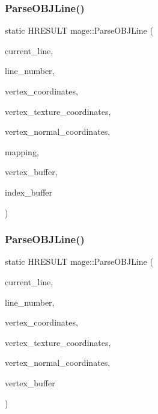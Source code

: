 \subsubsection{\texorpdfstring{Parse\+O\+B\+J\+Line()}{ParseOBJLine()}\hspace{0.1cm}{\footnotesize\ttfamily [1/2]}}
{\footnotesize\ttfamily static H\+R\+E\+S\+U\+LT mage\+::\+Parse\+O\+B\+J\+Line (\begin{DoxyParamCaption}\item[{char $\ast$}]{current\+\_\+line,  }\item[{uint32\+\_\+t}]{line\+\_\+number,  }\item[{vector$<$ X\+M\+F\+L\+O\+A\+T3 $>$ \&}]{vertex\+\_\+coordinates,  }\item[{vector$<$ X\+M\+F\+L\+O\+A\+T2 $>$ \&}]{vertex\+\_\+texture\+\_\+coordinates,  }\item[{vector$<$ X\+M\+F\+L\+O\+A\+T3 $>$ \&}]{vertex\+\_\+normal\+\_\+coordinates,  }\item[{map$<$ X\+M\+U\+I\+N\+T3, uint32\+\_\+t, \hyperlink{structmage_1_1_o_b_j_comparator_x_m_u_i_n_t3}{O\+B\+J\+Comparator\+X\+M\+U\+I\+N\+T3} $>$ \&}]{mapping,  }\item[{vector$<$ \hyperlink{structmage_1_1_vertex}{Vertex} $>$ \&}]{vertex\+\_\+buffer,  }\item[{vector$<$ uint32\+\_\+t $>$ \&}]{index\+\_\+buffer }\end{DoxyParamCaption})\hspace{0.3cm}{\ttfamily [static]}}

\hypertarget{namespacemage_af6d86000a9cb414a29248b42a44669c6}{}\label{namespacemage_af6d86000a9cb414a29248b42a44669c6} 
\subsubsection{\texorpdfstring{Parse\+O\+B\+J\+Line()}{ParseOBJLine()}\hspace{0.1cm}{\footnotesize\ttfamily [2/2]}}
{\footnotesize\ttfamily static H\+R\+E\+S\+U\+LT mage\+::\+Parse\+O\+B\+J\+Line (\begin{DoxyParamCaption}\item[{char $\ast$}]{current\+\_\+line,  }\item[{uint32\+\_\+t}]{line\+\_\+number,  }\item[{vector$<$ X\+M\+F\+L\+O\+A\+T3 $>$ \&}]{vertex\+\_\+coordinates,  }\item[{vector$<$ X\+M\+F\+L\+O\+A\+T2 $>$ \&}]{vertex\+\_\+texture\+\_\+coordinates,  }\item[{vector$<$ X\+M\+F\+L\+O\+A\+T3 $>$ \&}]{vertex\+\_\+normal\+\_\+coordinates,  }\item[{vector$<$ \hyperlink{structmage_1_1_vertex}{Vertex} $>$ \&}]{vertex\+\_\+buffer }\end{DoxyParamCaption})\hspace{0.3cm}{\ttfamily [static]}}

